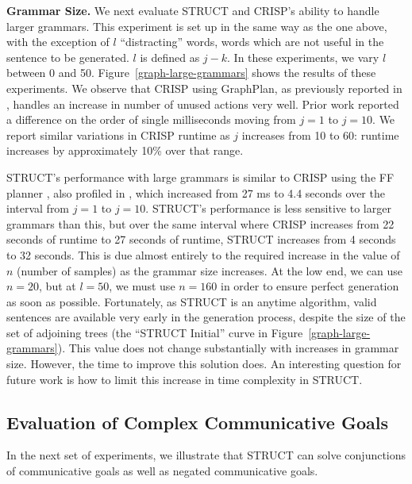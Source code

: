 {\bf Grammar Size.} We next evaluate STRUCT and CRISP's ability to
handle larger grammars. This experiment is set up in the same way as
the one above, with the exception of $l$ ``distracting'' words, words
which are not useful in the sentence to be generated.  $l$ is defined
as $j - k$.  In these experiments, we vary $l$ between 0 and 50.
Figure~\ref{graph-large-grammars} shows the results of these
experiments.  We observe that CRISP using GraphPlan, as previously
reported in \cite{koller_experiences_2011}, handles an increase in
number of unused actions very well.  Prior work reported a difference
on the order of single milliseconds moving from $j = 1$ to $j = 10$.
We report similar variations in CRISP runtime as $j$ increases from 10
to 60: runtime increases by approximately 10\% over that range.

STRUCT's performance with large grammars is similar to CRISP using the
FF planner \cite{hoffmann_ff_2001}, also profiled in
\cite{koller_experiences_2011}, which increased from 27 ms to 4.4
seconds over the interval from $j = 1$ to $j = 10$.  STRUCT's
performance is less sensitive to larger grammars than this, but over
the same interval where CRISP increases from 22 seconds of runtime to
27 seconds of runtime, STRUCT increases from 4 seconds to 32 seconds.
This is due almost entirely to the required increase in the value of
$n$ (number of samples) as the grammar size increases.  At the low
end, we can use $n=20$, but at $l = 50$, we must use $n = 160$ in
order to ensure perfect generation as soon as possible.  Fortunately,
as STRUCT is an anytime algorithm, valid sentences are available very
early in the generation process, despite the size of the set of
adjoining trees (the ``STRUCT Initial'' curve in
Figure~\ref{graph-large-grammars}).  This value does not change
substantially with increases in grammar size.  However, the time to
improve this solution does. An interesting question for future work is
how to limit this increase in time complexity in STRUCT. 

\subsection{Evaluation of Complex Communicative Goals}
In the next set of experiments, we illustrate that STRUCT can solve
conjunctions of communicative goals as well as negated communicative goals.

